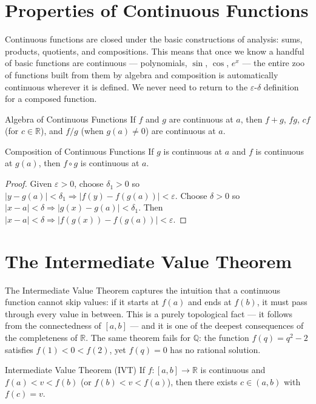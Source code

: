 \documentclass[12pt, openany]{book}
\theoremstyle{plain}
\theoremstyle{definition}
\theoremstyle{remark}
\newcommand{\Q}{\mathbb{Q}}
\newcommand{\R}{\mathbb{R}}
\newcommand{\eps}{\varepsilon}
\newcommand{\del}{\delta}
\begin{document}
\section{Properties of Continuous Functions}

Continuous functions are closed under the basic constructions of analysis: sums, products, quotients, and compositions.  This means that once we know a handful of basic functions are continuous --- polynomials, $\sin$, $\cos$, $e^x$ --- the entire zoo of functions built from them by algebra and composition is automatically continuous wherever it is defined.  We never need to return to the $\varepsilon$-$\delta$ definition for a composed function.

\begin{thmbox}{Algebra of Continuous Functions}
If $f$ and $g$ are continuous at $a$, then $f + g$, $fg$, $cf$ (for $c \in \R$), and $f/g$ (when $g(a) \neq 0$) are continuous at $a$.
\end{thmbox}
\color{black}

\begin{thmbox}{Composition of Continuous Functions}
If $g$ is continuous at $a$ and $f$ is continuous at $g(a)$, then $f \circ g$ is continuous at $a$.
\end{thmbox}
\color{black}

\begin{proof}
Given $\eps > 0$, choose $\del_1 > 0$ so $|y - g(a)| < \del_1 \Rightarrow |f(y) - f(g(a))| < \eps$. Choose $\del > 0$ so $|x - a| < \del \Rightarrow |g(x) - g(a)| < \del_1$. Then $|x - a| < \del \Rightarrow |f(g(x)) - f(g(a))| < \eps$.
\end{proof}

\section{The Intermediate Value Theorem}

The Intermediate Value Theorem captures the intuition that a continuous function cannot skip values: if it starts at $f(a)$ and ends at $f(b)$, it must pass through every value in between.  This is a purely topological fact --- it follows from the connectedness of $[a,b]$ --- and it is one of the deepest consequences of the completeness of $\R$.  The same theorem fails for $\Q$: the function $f(q) = q^2 - 2$ satisfies $f(1) < 0 < f(2)$, yet $f(q) = 0$ has no rational solution.

\begin{thmbox}{Intermediate Value Theorem (IVT)}
If $f : [a, b] \to \R$ is continuous and $f(a) < v < f(b)$ (or $f(b) < v < f(a)$), then there exists $c \in (a, b)$ with $f(c) = v$.
\end{thmbox}
\color{black}
\end{document}
